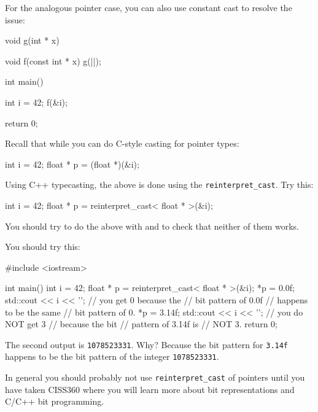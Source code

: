 \begin{consolethree}[escapeinside=||]
For the analogous pointer case, you can also use constant cast to
resolve the issue:

\begin{consolethree}[escapeinside=||]
void g(int * x)
{}

void f(const int * x)
{    
     g(|\EMPHASIZE{}|);
}

int main()
{   
    int i = 42;
    f(&i);

    return 0;
}
\end{consolethree}

\newpage{}

Recall that while you can do C-style casting for pointer types:

\begin{console}
int i = 42;
float * p = (float *)(&i);
\end{console}

Using C++ typecasting, the above is done using the \texttt{reinterpret\_cast}. Try this:

\begin{console}
int i = 42;
float * p = reinterpret_cast< float * >(&i);
\end{console}

You should try to do the above with \texttt{} and \texttt{} to check that neither of them works.

You should try this:

\begin{console}
#include <iostream>

int main()
{   
    int i = 42;
    float * p = reinterpret_cast< float * >(&i);
    *p = 0.0f;
    std::cout << i << '\n'; // you get 0 because the
                            // bit pattern of 0.0f
                            // happens to be the same
                            // bit pattern of 0.
    *p = 3.14f;
    std::cout << i << '\n'; // you do NOT get 3
                            // because the bit
                            // pattern of 3.14f is
                            // NOT 3.
    return 0;
}
\end{console}

The second output is \texttt{1078523331}. Why? Because the bit pattern for \texttt{3.14f} happens to be the bit pattern of the integer \texttt{1078523331}.

In general you should probably not use \texttt{reinterpret\_cast} of pointers until you have taken CISS360 where you will learn more about bit representations and C/C++ bit programming.


\end{consolethree}
